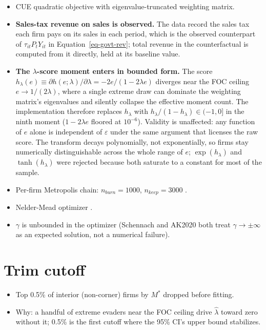 \documentclass[
  12pt,
  letterpaper,
  oneside,
  openany]{report}
\providecommand{\tightlist}{%
  \setlength{\itemsep}{0pt}\setlength{\parskip}{0pt}}
\begin{document}
\begin{itemize}
\tightlist
\item
  CUE quadratic objective with eigenvalue-truncated weighting matrix.
\item
  \textbf{Sales-tax revenue on sales is observed.} The data record the
  sales tax each firm pays on its sales in each period, which is the
  observed counterpart of \(\tau_{it}P_tY_{it}\) in
  Equation~\ref{eq-govt-rev}; total revenue in the counterfactual is
  computed from it directly, held at its baseline value.
\item
  \textbf{The \(\lambda\)-score moment enters in bounded form.} The
  score
  \(h_\lambda(e)\equiv\partial h(e;\lambda)/\partial\lambda=-2e/(1-2\lambda e)\)
  diverges near the FOC ceiling \(e\to1/(2\lambda)\), where a single
  extreme draw can dominate the weighting matrix's eigenvalues and
  silently collapse the effective moment count. The implementation
  therefore replaces \(h_\lambda\) with
  \(h_\lambda/(1-h_\lambda)\in(-1,0]\) in the ninth moment
  (\(1-2\lambda e\) floored at \(10^{-6}\)). Validity is unaffected: any
  function of \(e\) alone is independent of \(\varepsilon\) under the
  same argument that licenses the raw score. The transform decays
  polynomially, not exponentially, so firms stay numerically
  distinguishable across the whole range of \(e\); \(\exp(h_\lambda)\)
  and \(\tanh(h_\lambda)\) were rejected because both saturate to a
  constant for most of the sample.
\item
  Per-firm Metropolis chain: \(n_{burn}=1000\), \(n_{keep}=3000\) .
\item
  Nelder-Mead optimizer .
\item
  \(\gamma\) is unbounded in the optimizer (Schennach and AK2020 both
  treat \(\gamma\to\pm\infty\) as an expected solution, not a numerical
  failure).
\end{itemize}

\section{Trim cutoff}\label{trim-cutoff}

\begin{itemize}
\tightlist
\item
  Top 0.5\% of interior (non-corner) firms by \(M^*\) dropped before
  fitting.
\item
  Why: a handful of extreme evaders near the FOC ceiling drive
  \(\hat\lambda\) toward zero without it; 0.5\% is the first cutoff
  where the 95\% CI's upper bound stabilizes.
\end{itemize}
\end{document}
